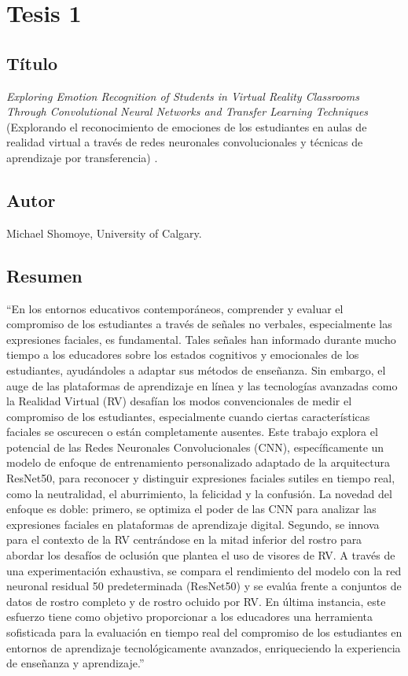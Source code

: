 \section{Tesis 1}

\subsection{Título}
\textit{Exploring Emotion Recognition of Students in Virtual Reality Classrooms Through Convolutional Neural Networks and Transfer Learning Techniques} (Explorando el reconocimiento de emociones de los estudiantes en aulas de realidad virtual a través de redes neuronales convolucionales y técnicas de aprendizaje por transferencia) \cite{shomoye2024}.

\subsection{Autor}
Michael Shomoye, University of Calgary.

\subsection{Resumen}
``En los entornos educativos contemporáneos, comprender y evaluar el compromiso de los estudiantes a través de señales no verbales, especialmente las expresiones faciales, es fundamental. Tales señales han informado durante mucho tiempo a los educadores sobre los estados cognitivos y emocionales de los estudiantes, ayudándoles a adaptar sus métodos de enseñanza. Sin embargo, el auge de las plataformas de aprendizaje en línea y las tecnologías avanzadas como la Realidad Virtual (RV) desafían los modos convencionales de medir el compromiso de los estudiantes, especialmente cuando ciertas características faciales se oscurecen o están completamente ausentes. Este trabajo explora el potencial de las Redes Neuronales Convolucionales (CNN), específicamente un modelo de enfoque de entrenamiento personalizado adaptado de la arquitectura ResNet50, para reconocer y distinguir expresiones faciales sutiles en tiempo real, como la neutralidad, el aburrimiento, la felicidad y la confusión. La novedad del enfoque es doble: primero, se optimiza el poder de las CNN para analizar las expresiones faciales en plataformas de aprendizaje digital. Segundo, se innova para el contexto de la RV centrándose en la mitad inferior del rostro para abordar los desafíos de oclusión que plantea el uso de visores de RV. A través de una experimentación exhaustiva, se compara el rendimiento del modelo con la red neuronal residual 50 predeterminada (ResNet50) y se evalúa frente a conjuntos de datos de rostro completo y de rostro ocluido por RV. En última instancia, este esfuerzo tiene como objetivo proporcionar a los educadores una herramienta sofisticada para la evaluación en tiempo real del compromiso de los estudiantes en entornos de aprendizaje tecnológicamente avanzados, enriqueciendo la experiencia de enseñanza y aprendizaje.'' \cite{shomoye2024}

